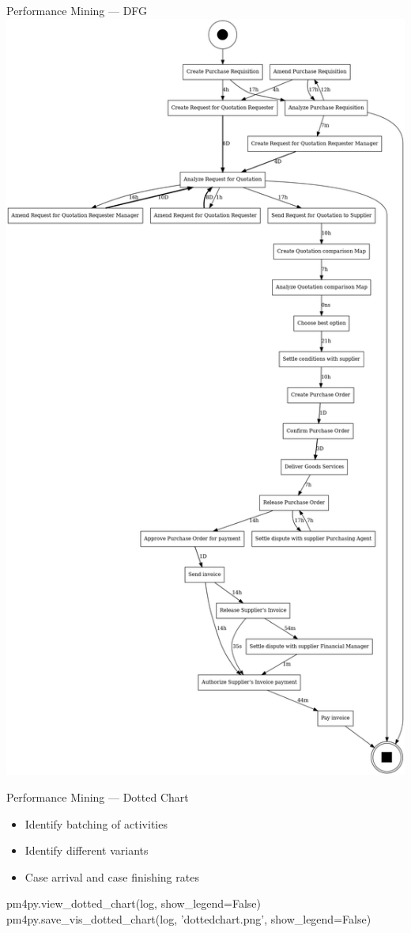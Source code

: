 \documentclass[ignorenonframetext,xcolor=x11names]{beamer}
\begin{document}
\begin{frame}[fragile]{Performance Mining --- DFG}
\centering
\includegraphics[width=.8\textwidth]{perfdfg.png}
\end{frame}

\begin{frame}[fragile]{Performance Mining --- Dotted Chart}
\begin{itemize}
   \item Identify batching of activities
   \item Identify different variants
   \item Case arrival and case finishing rates
\end{itemize}
\footnotesize
\begin{pythoncode}
pm4py.view_dotted_chart(log, show_legend=False)
pm4py.save_vis_dotted_chart(log, 
   'dottedchart.png', show_legend=False)
\end{pythoncode}
\end{frame}
\end{document}
